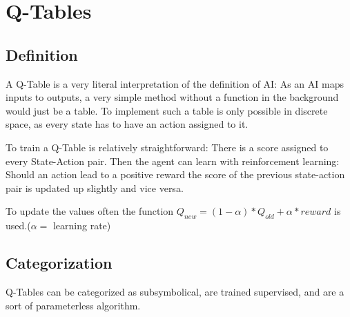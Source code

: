 \section{Q-Tables}
\label{sec:QTable}
\subsection{Definition}
A Q-Table is a very literal interpretation of the definition of AI: As an AI maps inputs to outputs, a very simple method without a function in the background would just be a table. To implement such a table is only possible in discrete space, as every state has to have an action assigned to it.

To train a Q-Table is relatively straightforward: There is a score assigned to every State-Action pair. Then the agent can learn with reinforcement learning: Should an action lead to a positive reward the score of the previous state-action pair is updated up slightly and vice versa.

To update the values often the function $Q_{new}=(1-\alpha)*Q_{old}+\alpha*reward$ is used.($\alpha=$ learning rate)

\subsection{Categorization}
Q-Tables can be categorized as subsymbolical, are trained supervised, and are a sort of parameterless algorithm.